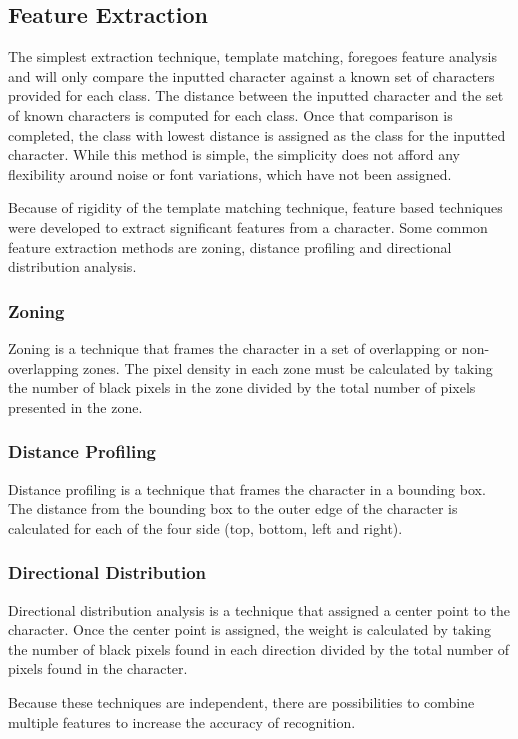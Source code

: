 \subsection{Feature Extraction}

The simplest extraction technique, template matching, foregoes feature analysis and will only compare the inputted character against a known set of characters provided for each class. The distance between the inputted character and the set of known characters is computed for each class. Once that comparison is completed, the class with lowest distance is assigned as the class for the inputted character. While this method is simple, the simplicity does not afford any flexibility around noise or font variations, which have not been assigned. 

Because of rigidity of the template matching technique, feature based techniques were developed to extract significant features from a character. Some common feature extraction methods are zoning, distance profiling and directional distribution analysis\cite{hid-sp18-414-www-featureextraction}.
\subsubsection{Zoning}
Zoning is a technique that frames the character in a set of overlapping or non-overlapping zones. The pixel density in each zone must be calculated by taking the number of black pixels in the zone divided by the total number of pixels presented in the zone.

\subsubsection{Distance Profiling}
Distance profiling is a technique that frames the character in a bounding box. The distance from the bounding box to the outer edge of the character is calculated for each of the four side (top, bottom, left and right).

\subsubsection{Directional Distribution}
Directional distribution analysis is a technique that assigned a center point to the character. Once the center point is assigned, the weight is calculated by taking the number of black pixels found in each direction divided by the total number of pixels found in the character.

Because these techniques are independent, there are possibilities to combine multiple features to increase the accuracy of recognition. 


